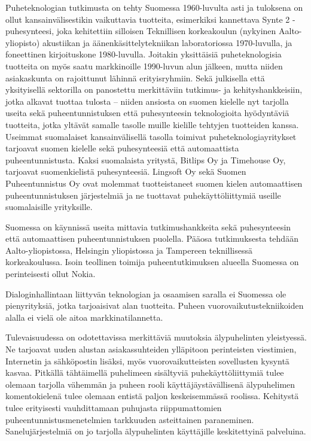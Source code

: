 \documentclass{../../metanetpaper}
\begin{document}
\begin{Parallel}[c]{79mm}{78mm}
{Puheteknologian tutkimusta on tehty Suomessa 1960-luvulta asti ja
tuloksena on ollut kansainvälisestikin vaikuttavia tuotteita,
esimerkiksi kannettava Synte 2 -puhesynteesi, joka kehitettiin
silloisen Teknillisen korkeakoulun (nykyinen Aalto-yliopisto)
akustiikan ja äänenkäsittelytekniikan laboratoriossa 1970-luvulla, ja
foneettinen kirjoituskone 1980-luvulla. Joitakin yksittäisiä
puheteknologisia tuotteita on myös saatu markkinoille 1990-luvun alun
jälkeen, mutta niiden asiakaskunta on rajoittunut lähinnä
erityisryhmiin. Sekä julkisella että yksityisellä sektorilla on panostettu 
merkittäviin tutkimus- ja kehityshankkeisiin, jotka alkavat tuottaa tulosta 
– niiden ansiosta on suomen kielelle
nyt tarjolla useita sekä puheentunnistuksen että puhesynteesin
teknologioita hyödyntäviä tuotteita, jotka yltävät samalle tasolle
muille kielille tehtyjen tuotteiden kanssa. Useimmat suomalaiset
kansainvälisellä tasolla toimivat puheteknologiayritykset tarjoavat
suomen kielelle sekä puhesynteesiä että automaattista
puheentunnistusta. Kaksi suomalaista yritystä, Bitlips Oy ja Timehouse
Oy, tarjoavat suomenkielistä puhesynteesiä. Lingsoft Oy sekä Suomen
Puheentunnistus Oy ovat molemmat tuotteistaneet suomen kielen
automaattisen puheentunnistuksen järjestelmiä ja ne tuottavat
puhekäyttöliittymiä useille suomalaisille yrityksille.

Suomessa on käynnissä useita mittavia tutkimushankkeita sekä
puhesynteesin että automaattisen puheentunnistuksen puolella. Pääosa
tutkimuksesta tehdään Aalto-yliopistossa, Helsingin yliopistossa ja
Tampereen teknillisessä korkeakoulussa. Isoin teollinen toimija
puheentutkimuksen alueella Suomessa on perinteisesti ollut Nokia.

Dialoginhallintaan liittyvän teknologian ja osaamisen saralla ei
Suomessa ole pienyrityksiä, jotka tarjoaisivat alan tuotteita. Puheen
vuorovaikutustekniikoiden alalla ei vielä ole aitoa markkinatilannetta.

Tulevaisuudessa on odotettavissa merkittäviä muutoksia älypuhelinten
yleistyessä. Ne tarjoavat uuden alustan asiakassuhteiden
ylläpitoon perinteisten viestimien, Internetin ja sähköpostin
lisäksi, myös vuorovaikutteisten sovellusten kysyntä kasvaa. Pitkällä tähtäimellä
puhelimeen sisältyviä puhekäyttöliittymiä tulee olemaan tarjolla
vähemmän ja puheen rooli käyttäjäystävällisenä älypuhelimen
komentokielenä tulee olemaan entistä paljon keskeisemmässä
roolissa. Kehitystä tulee erityisesti vauhdittamaan puhujasta
riippumattomien puheentunnistusmenetelmien tarkkuuden asteittainen
paraneminen.  Sanelujärjestelmiä on jo tarjolla älypuhelinten
käyttäjille keskitettyinä palveluina.
}


\end{Parallel}
\end{document}
